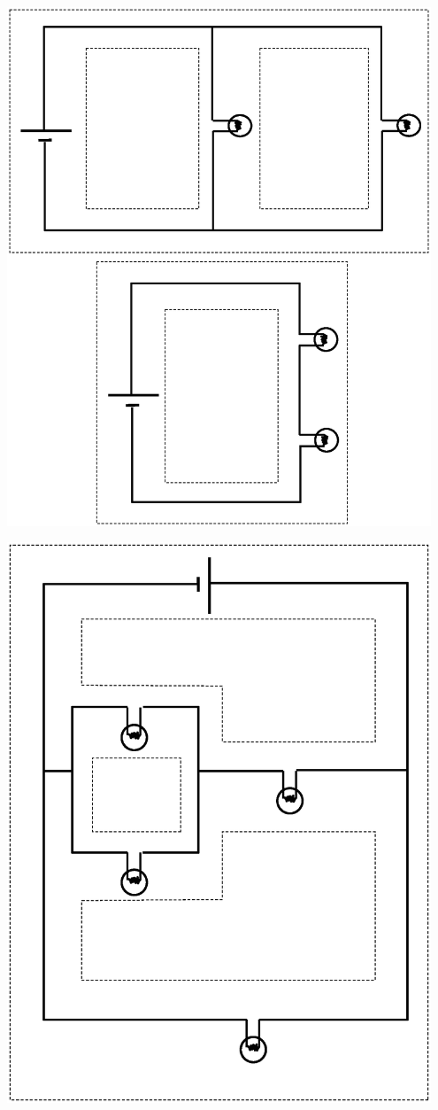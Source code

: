 \cleardoublepage %
\begin{center}
\includegraphics[width=0.95\textwidth]{electric_circuits/cutout_page1.eps}
\end{center}

\newpage

\begin{center}
\includegraphics[width=0.95\textwidth]{electric_circuits/cutout_page2.eps}
\cleardoublepage

\end{center}


